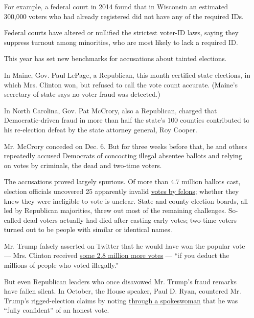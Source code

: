 For example, a federal court in 2014 found that in Wisconsin an
estimated 300,000 voters who had already registered did not have any of
the required IDs.

Federal courts have altered or nullified the strictest voter-ID laws,
saying they suppress turnout among minorities, who are most likely to
lack a required ID.

This year has set new benchmarks for accusations about tainted
elections.

In Maine, Gov. Paul LePage, a Republican, this month certified state
elections, in which Mrs. Clinton won, but refused to call the vote count
accurate. (Maine's secretary of state says no voter fraud was detected.)

In North Carolina, Gov. Pat McCrory, also a Republican, charged that
Democratic-driven fraud in more than half the state's 100 counties
contributed to his re-election defeat by the state attorney general, Roy
Cooper.

Mr. McCrory conceded on Dec. 6. But for three weeks before that, he and
others repeatedly accused Democrats of concocting illegal absentee
ballots and relying on votes by criminals, the dead and two-time voters.

The accusations proved largely spurious. Of more than 4.7 million
ballots cast, election officials uncovered 25 apparently invalid
\href{http://www.newsobserver.com/news/politics-government/election/article116789083.html}{votes
by felons}; whether they knew they were ineligible to vote is unclear.
State and county election boards, all led by Republican majorities,
threw out most of the remaining challenges. So-called dead voters
actually had died after casting early votes; two-time voters turned out
to be people with similar or identical names.

Mr. Trump falsely asserted on Twitter that he would have won the popular
vote --- Mrs. Clinton received
\href{http://www.nytimes3xbfgragh.onion/elections/results/president}{some
2.8 million more votes} --- ``if you deduct the millions of people who
voted illegally.''

But even Republican leaders who once disavowed Mr. Trump's fraud remarks
have fallen silent. In October, the House speaker, Paul D. Ryan,
countered Mr. Trump's rigged-election claims by noting
\href{http://thehill.com/blogs/ballot-box/presidential-races/301200-paul-ryan-confident-the-election-will-not-be-rigged}{through
a spokeswoman} that he was ``fully confident'' of an honest vote.

